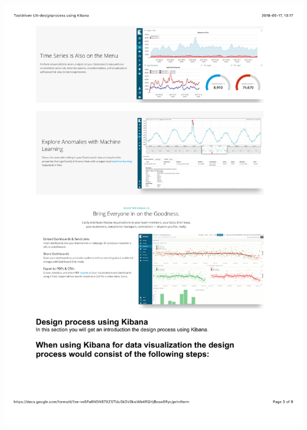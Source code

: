 \documentclass[12pt]{kththesis}
\begin{document}
\begin{appendices}
\includegraphics[width=1\textwidth]{UX_designprocess3.pdf}
\newpage

\end{appendices}
\end{document}
